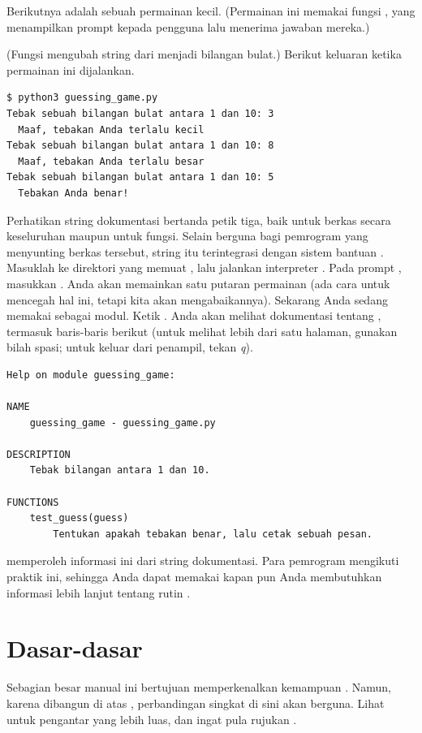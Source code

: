 Berikutnya adalah sebuah permainan kecil. 
(Permainan ini memakai fungsi \python{} , yang menampilkan prompt kepada pengguna
lalu menerima jawaban mereka.)

(Fungsi  mengubah string dari  menjadi bilangan bulat.)
Berikut keluaran ketika permainan ini dijalankan.
\begin{lstlisting}
$ python3 guessing_game.py
Tebak sebuah bilangan bulat antara 1 dan 10: 3
  Maaf, tebakan Anda terlalu kecil
Tebak sebuah bilangan bulat antara 1 dan 10: 8
  Maaf, tebakan Anda terlalu besar
Tebak sebuah bilangan bulat antara 1 dan 10: 5
  Tebakan Anda benar!
\end{lstlisting}  %

Perhatikan string dokumentasi bertanda petik tiga, baik untuk 
berkas secara keseluruhan maupun untuk fungsi.
Selain berguna bagi pemrogram yang menyunting berkas tersebut, 
string itu terintegrasi dengan sistem bantuan \python{}. 
Masuklah ke direktori yang memuat , lalu jalankan 
interpreter \python{}.
Pada prompt \inlinecode{>>>}, masukkan .
Anda akan memainkan satu putaran permainan (ada cara untuk mencegah hal ini,
tetapi kita akan mengabaikannya).
Sekarang Anda sedang memakai  sebagai modul.
Ketik
.
Anda akan melihat dokumentasi tentang , 
termasuk baris-baris berikut
(untuk melihat lebih dari satu halaman, gunakan bilah spasi; untuk keluar dari penampil, tekan \textit{q}).
\begin{lstlisting}
Help on module guessing_game:

NAME
    guessing_game - guessing_game.py

DESCRIPTION
    Tebak bilangan antara 1 dan 10.

FUNCTIONS
    test_guess(guess)
        Tentukan apakah tebakan benar, lalu cetak sebuah pesan.
\end{lstlisting}
\python{} memperoleh informasi ini dari string dokumentasi.
Para pemrogram \Sage{} mengikuti praktik ini, sehingga 
Anda dapat memakai  
kapan pun Anda membutuhkan informasi lebih lanjut tentang rutin \Sage{}.





\section{Dasar-dasar \Sage{}}
Sebagian besar manual ini bertujuan memperkenalkan kemampuan \Sage{}.
Namun, karena \Sage{} dibangun di atas \python{}, perbandingan singkat di sini akan berguna.
Lihat \citep{SageTeam19} untuk pengantar yang lebih luas, dan 
ingat pula rujukan \citep{SageTeam19ref}.



